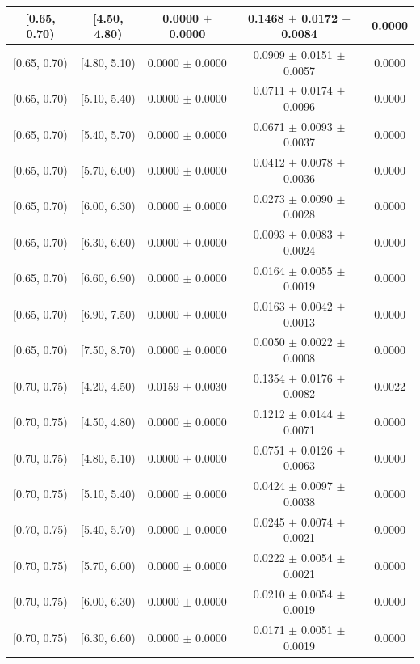 \begin{longtable}{|c|c|c|c|c|}
\hline
[0.65, 0.70) & [4.50, 4.80) & 0.0000 $\pm$ 0.0000 & 0.1468 $\pm$ 0.0172 $\pm$ 0.0084 & 0.0000 \\ 
\hline
[0.65, 0.70) & [4.80, 5.10) & 0.0000 $\pm$ 0.0000 & 0.0909 $\pm$ 0.0151 $\pm$ 0.0057 & 0.0000 \\ 
\hline
[0.65, 0.70) & [5.10, 5.40) & 0.0000 $\pm$ 0.0000 & 0.0711 $\pm$ 0.0174 $\pm$ 0.0096 & 0.0000 \\ 
\hline
[0.65, 0.70) & [5.40, 5.70) & 0.0000 $\pm$ 0.0000 & 0.0671 $\pm$ 0.0093 $\pm$ 0.0037 & 0.0000 \\ 
\hline
[0.65, 0.70) & [5.70, 6.00) & 0.0000 $\pm$ 0.0000 & 0.0412 $\pm$ 0.0078 $\pm$ 0.0036 & 0.0000 \\ 
\hline
[0.65, 0.70) & [6.00, 6.30) & 0.0000 $\pm$ 0.0000 & 0.0273 $\pm$ 0.0090 $\pm$ 0.0028 & 0.0000 \\ 
\hline
[0.65, 0.70) & [6.30, 6.60) & 0.0000 $\pm$ 0.0000 & 0.0093 $\pm$ 0.0083 $\pm$ 0.0024 & 0.0000 \\ 
\hline
[0.65, 0.70) & [6.60, 6.90) & 0.0000 $\pm$ 0.0000 & 0.0164 $\pm$ 0.0055 $\pm$ 0.0019 & 0.0000 \\ 
\hline
[0.65, 0.70) & [6.90, 7.50) & 0.0000 $\pm$ 0.0000 & 0.0163 $\pm$ 0.0042 $\pm$ 0.0013 & 0.0000 \\ 
\hline
[0.65, 0.70) & [7.50, 8.70) & 0.0000 $\pm$ 0.0000 & 0.0050 $\pm$ 0.0022 $\pm$ 0.0008 & 0.0000 \\ 
\hline
[0.70, 0.75) & [4.20, 4.50) & 0.0159 $\pm$ 0.0030 & 0.1354 $\pm$ 0.0176 $\pm$ 0.0082 & 0.0022 \\ 
\hline
[0.70, 0.75) & [4.50, 4.80) & 0.0000 $\pm$ 0.0000 & 0.1212 $\pm$ 0.0144 $\pm$ 0.0071 & 0.0000 \\ 
\hline
[0.70, 0.75) & [4.80, 5.10) & 0.0000 $\pm$ 0.0000 & 0.0751 $\pm$ 0.0126 $\pm$ 0.0063 & 0.0000 \\ 
\hline
[0.70, 0.75) & [5.10, 5.40) & 0.0000 $\pm$ 0.0000 & 0.0424 $\pm$ 0.0097 $\pm$ 0.0038 & 0.0000 \\ 
\hline
[0.70, 0.75) & [5.40, 5.70) & 0.0000 $\pm$ 0.0000 & 0.0245 $\pm$ 0.0074 $\pm$ 0.0021 & 0.0000 \\ 
\hline
[0.70, 0.75) & [5.70, 6.00) & 0.0000 $\pm$ 0.0000 & 0.0222 $\pm$ 0.0054 $\pm$ 0.0021 & 0.0000 \\ 
\hline
[0.70, 0.75) & [6.00, 6.30) & 0.0000 $\pm$ 0.0000 & 0.0210 $\pm$ 0.0054 $\pm$ 0.0019 & 0.0000 \\ 
\hline
[0.70, 0.75) & [6.30, 6.60) & 0.0000 $\pm$ 0.0000 & 0.0171 $\pm$ 0.0051 $\pm$ 0.0019 & 0.0000 \\ 

\end{longtable}
